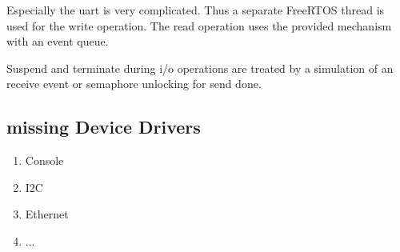 Especially the uart is very complicated. Thus a separate FreeRTOS thread 
is used for the write operation. The read operation uses the 
provided mechanism with an event queue.

Suspend and terminate during i/o operations are treated by a simulation
of an receive event or semaphore unlocking for send done.


\subsection{missing Device Drivers}
\begin{enumerate}
\item Console
\item I2C
\item Ethernet
\item ...
\end{enumerate}


